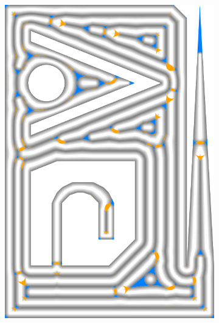 \begin{figure}
\begin{subfigure}{\figwidth}
\includegraphics[height=\figheight]{sources-validation-gMAT-example-TEST-InwardDistributed-accuracy.png}

\end{subfigure}
\end{figure}
